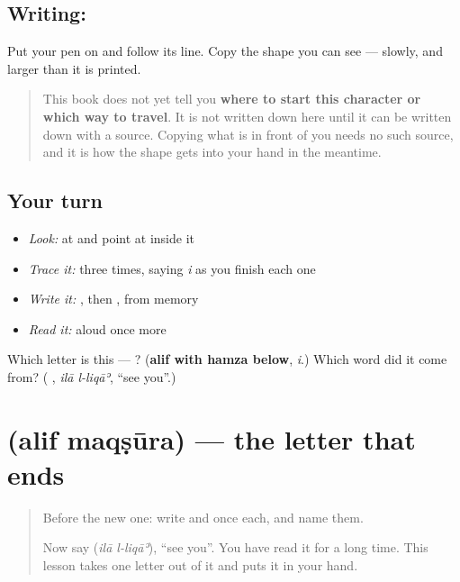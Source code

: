 \subsection*{Writing: }
Put your pen on  and follow its line. Copy the shape you can see — slowly, and larger than it is printed.

\begin{quote}
This book does not yet tell you \textbf{where to start this character or which way to travel}. It is not written down here until it can be written down with a source. Copying what is in front of you needs no such source, and it is how the shape gets into your hand in the meantime.
\end{quote}

\subsection*{Your turn}
\begin{itemize}
\raggedright
  \item \emph{Look:} at \textbf{ } and point at  inside it
  \item \emph{Trace it:}  three times, saying \emph{i} as you finish each one
  \item \emph{Write it:} , then , from memory
  \item \emph{Read it:} \textbf{ } aloud once more
\end{itemize}

\begin{tcolorbox}[breakable,colback=teal!4,colframe=teal!35!black,title={Before you move on}]
Which letter is this — ? (\textbf{alif with hamza below}, \emph{i}.) Which word did it come from? (\textbf{ }, \emph{ilā l-liqāʾ}, \textquotedblleft{}see you\textquotedblright{}.)
\end{tcolorbox}
\section[\texorpdfstring{\ar{ى} (alif maqṣūra)}{ى (alif maqṣūra)}]{ (alif maqṣūra) — the letter that ends }

\label{lesson:AR-W47-alif-maqsura}



\begin{quote}
Before the new one: write  and  once each, and name them.

Now say \textbf{ } (\emph{ilā l-liqāʾ}), \textquotedblleft{}see you\textquotedblright{}. You have read it for a long time. This lesson takes one letter out of it and puts it in your hand.
\end{quote}

